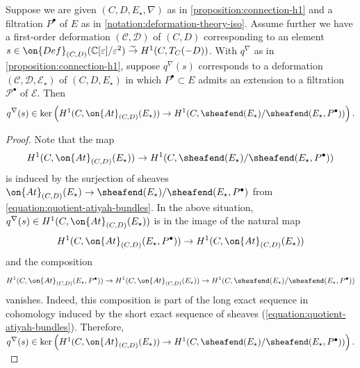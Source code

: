 \begin{lemma}
\notready
	\label{lemma:parabolic-extension-obstruction}
	Suppose we are given $(C,D,E_\star,\nabla)$ as in
	\autoref{proposition:connection-h1}
	and a filtration $P^\bullet$ of $E$ as in
	\autoref{notation:deformation-theory-iso}.
	Assume
	further we have a first-order deformation $(\mathscr C, \mathscr D)$ of $(C, D)$
	corresponding to an element $s \in \on{Def}_{(C,D)}(\mathbb{C}[\varepsilon]/\varepsilon^2)\overset{\sim}{\to} H^1(C, T_C(-D))$.
	With $q^\nabla$ as in
	\autoref{proposition:connection-h1},
	suppose $q^\nabla(s)$
	corresponds to a deformation $(\mathscr C, \mathscr D, \mathscr E_\star)$ of
	$(C,D,E_\star)$
in which $P^\bullet \subset E$ admits an extension to a filtration $\mathscr
P^\bullet$
of $\mathscr E$.
Then $$q^\nabla(s) \in \ker
\left(H^1(C, \on{At}_{(C,D)}(E_\star)) \to H^1(C,
\sheafend(E_\star)/\sheafend(E_\star, P^\bullet))\right).$$
\end{lemma}
\begin{proof}
	Note that the map
	$$H^1(C, \on{At}_{(C,D)}(E_\star)) \to
	H^1(C,\sheafend(E_\star)/\sheafend(E_\star, P^\bullet))$$
is induced by the surjection of sheaves
$\on{At}_{(C,D)}(E_\star)
\to \sheafend(E_\star)/\sheafend(E_\star, P^\bullet)$
from \eqref{equation:quotient-atiyah-bundles}.
In the above situation,
	$q^\nabla(s) \in H^1(C, \on{At}_{(C,D)}(E_\star))$ is in the image of the natural map
	$$H^1(C, \on{At}_{(C,D)}(E_\star, P^\bullet))\to H^1(C,
	\on{At}_{(C,D)}(E_\star))$$ and the composition
	$$H^1(C, \on{At}_{(C,D)}(E_\star, P^\bullet)) \to H^1(C,
	\on{At}_{(C,D)}(E_\star)) \to H^1(C,
\sheafend(E_\star)/\sheafend(E_\star, P^\bullet))$$
vanishes. Indeed, this composition is part of the long exact sequence in cohomology induced by the short exact
sequence of sheaves (\ref{equation:quotient-atiyah-bundles}).
Therefore,
$q^\nabla(s) \in \ker
\left(H^1(C, \on{At}_{(C,D)}(E_\star)) \to H^1(C,
\sheafend(E_\star)/\sheafend(E_\star, P^\bullet))\right).$
\end{proof}
